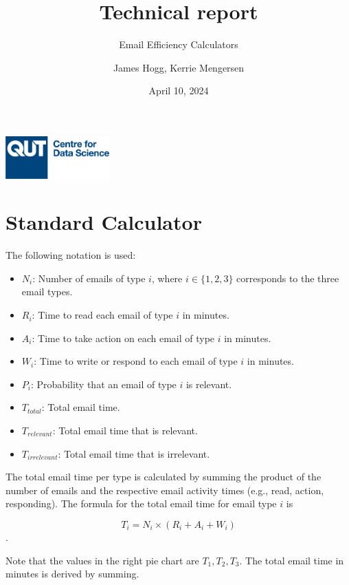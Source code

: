 \documentclass[
  reportpaper,
  DIV=11,
  numbers=noendperiod]{scrartcl}
\title{Technical report}
\subtitle{Email Efficiency Calculators}
\author{James Hogg, Kerrie Mengersen}
\date{April 10, 2024}
\providecommand{\tightlist}{%
  \setlength{\itemsep}{0pt}\setlength{\parskip}{0pt}}\usepackage{longtable,booktabs,array}
\begin{document}
\maketitle

\begin{center}
\includegraphics[width=0.3\textwidth]{../ed/static/ed/CDS-Logo-Blue.png}
\end{center}

\newpage{}

\section{Standard Calculator}\label{standard-calculator}

The following notation is used:

\begin{itemize}
\tightlist
\item
  \(N_i\): Number of emails of type \(i\), where \(i \in \{1,2,3\}\)
  corresponds to the three email types.
\item
  \(R_i\): Time to read each email of type \(i\) in minutes.
\item
  \(A_i\): Time to take action on each email of type \(i\) in minutes.
\item
  \(W_i\): Time to write or respond to each email of type \(i\) in
  minutes.
\item
  \(P_i\): Probability that an email of type \(i\) is relevant.
\item
  \(T_{total}\): Total email time.
\item
  \(T_{relevant}\): Total email time that is relevant.
\item
  \(T_{irrelevant}\): Total email time that is irrelevant.
\end{itemize}

The total email time per type is calculated by summing the product of
the number of emails and the respective email activity times (e.g.,
read, action, responding). The formula for the total email time for
email type \(i\) is

\[ T_i = N_i \times (R_i + A_i + W_i) \].

Note that the values in the right pie chart are \(T_1,T_2,T_3\). The
total email time in minutes is derived by summing.
\end{document}
